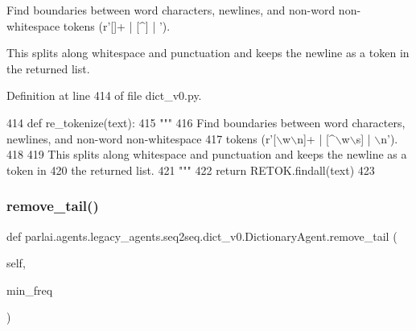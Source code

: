 \begin{DoxyVerb}Find boundaries between word characters, newlines, and non-word non-whitespace
tokens (r'[\w\n]+ | [^\w\s] | \n').

This splits along whitespace and punctuation and keeps the newline as a token in
the returned list.
\end{DoxyVerb}
 

Definition at line 414 of file dict\+\_\+v0.\+py.


\begin{DoxyCode}
414     \textcolor{keyword}{def }re\_tokenize(text):
415         \textcolor{stringliteral}{"""}
416 \textcolor{stringliteral}{        Find boundaries between word characters, newlines, and non-word non-whitespace}
417 \textcolor{stringliteral}{        tokens (r'[\(\backslash\)w\(\backslash\)n]+ | [^\(\backslash\)w\(\backslash\)s] | \(\backslash\)n').}
418 \textcolor{stringliteral}{}
419 \textcolor{stringliteral}{        This splits along whitespace and punctuation and keeps the newline as a token in}
420 \textcolor{stringliteral}{        the returned list.}
421 \textcolor{stringliteral}{        """}
422         \textcolor{keywordflow}{return} RETOK.findall(text)
423 
\end{DoxyCode}
\mbox{\label{classparlai_1_1agents_1_1legacy__agents_1_1seq2seq_1_1dict__v0_1_1DictionaryAgent_accabae63114f30e336e560ee1b7420da}} 
\subsubsection{\texorpdfstring{remove\+\_\+tail()}{remove\_tail()}}
{\footnotesize\ttfamily def parlai.\+agents.\+legacy\+\_\+agents.\+seq2seq.\+dict\+\_\+v0.\+Dictionary\+Agent.\+remove\+\_\+tail (\begin{DoxyParamCaption}\item[{}]{self,  }\item[{}]{min\+\_\+freq }\end{DoxyParamCaption})}

